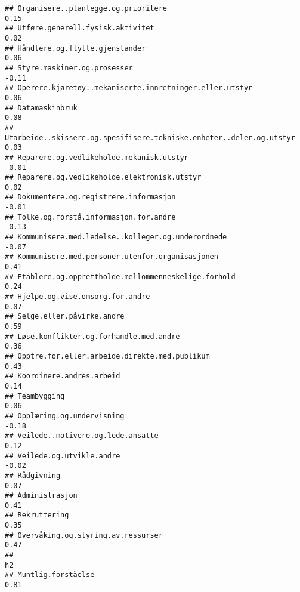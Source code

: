 \documentclass[
]{article}
\begin{document}
\begin{verbatim}
## Organisere..planlegge.og.prioritere                                               0.15
## Utføre.generell.fysisk.aktivitet                                                  0.02
## Håndtere.og.flytte.gjenstander                                                    0.06
## Styre.maskiner.og.prosesser                                                      -0.11
## Operere.kjøretøy..mekaniserte.innretninger.eller.utstyr                           0.06
## Datamaskinbruk                                                                    0.08
## Utarbeide..skissere.og.spesifisere.tekniske.enheter..deler.og.utstyr              0.03
## Reparere.og.vedlikeholde.mekanisk.utstyr                                         -0.01
## Reparere.og.vedlikeholde.elektronisk.utstyr                                       0.02
## Dokumentere.og.registrere.informasjon                                            -0.01
## Tolke.og.forstå.informasjon.for.andre                                            -0.13
## Kommunisere.med.ledelse..kolleger.og.underordnede                                -0.07
## Kommunisere.med.personer.utenfor.organisasjonen                                   0.41
## Etablere.og.opprettholde.mellommenneskelige.forhold                               0.24
## Hjelpe.og.vise.omsorg.for.andre                                                   0.07
## Selge.eller.påvirke.andre                                                         0.59
## Løse.konflikter.og.forhandle.med.andre                                            0.36
## Opptre.for.eller.arbeide.direkte.med.publikum                                     0.43
## Koordinere.andres.arbeid                                                          0.14
## Teambygging                                                                       0.06
## Opplæring.og.undervisning                                                        -0.18
## Veilede..motivere.og.lede.ansatte                                                 0.12
## Veilede.og.utvikle.andre                                                         -0.02
## Rådgivning                                                                        0.07
## Administrasjon                                                                    0.41
## Rekruttering                                                                      0.35
## Overvåking.og.styring.av.ressurser                                                0.47
##                                                                                    h2
## Muntlig.forståelse                                                               0.81

\end{verbatim}
\end{document}

